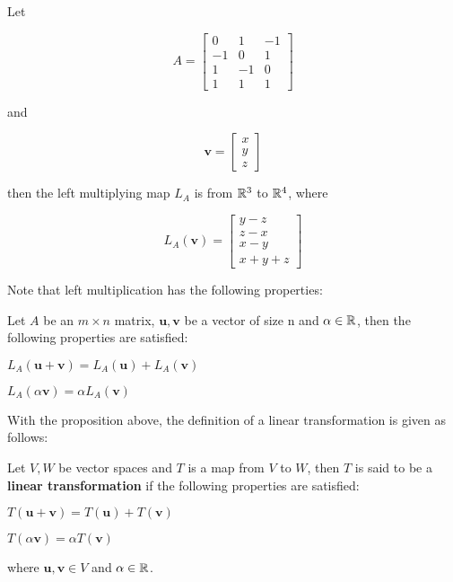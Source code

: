\documentclass[a4paper,12pt]{article}
\begin{document}
\begin{exm}
  Let

  $$A=\begin{bmatrix}
    0 & 1 & -1\\
    -1 & 0 & 1\\
    1 & -1 & 0\\
    1 & 1 & 1
  \end{bmatrix}$$\s

  and

  $$\mathbf{v}=\begin{bmatrix}
    x\\
    y\\
    z
  \end{bmatrix}$$\s

  then the left multiplying map $L_{A}$ is from $\mathbb{R}^{3}$ to $\mathbb{R}^{4}$, where

  $$L_{A}(\mathbf{v})=\begin{bmatrix}
    y-z\\
    z-x\\
    x-y\\
    x+y+z
  \end{bmatrix}$$
\end{exm}\n

Note that left multiplication has the following properties:\n

\begin{pst}
  Let $A$ be an $m\times n$ matrix, $\mathbf{u},\mathbf{v}$ be a vector of size n and $\alpha\in\mathbb{R}$, then the following properties are satisfied:

  \begin{alist}
    \item $L_{A}(\mathbf{u}+\mathbf{v})=L_{A}(\mathbf{u})+L_{A}(\mathbf{v})$
    \item $L_{A}(\alpha\mathbf{v})=\alpha L_{A}(\mathbf{v})$
  \end{alist}
\end{pst}\n

With the proposition above, the definition of a linear transformation is given as follows:

\begin{dft}
  Let $V,W$ be vector spaces and $T$ is a map from $V$ to $W$, then $T$ is said to be a \textbf{linear transformation} if the following properties are satisfied:

  \begin{alist}
    \item $T(\mathbf{u}+\mathbf{v})=T(\mathbf{u})+T(\mathbf{v})$
    \item $T(\alpha\mathbf{v})=\alpha T(\mathbf{v})$
  \end{alist}

  where $\mathbf{u},\mathbf{v}\in V$ and $\alpha\in\mathbb{R}$.
\end{dft}
\end{document}
